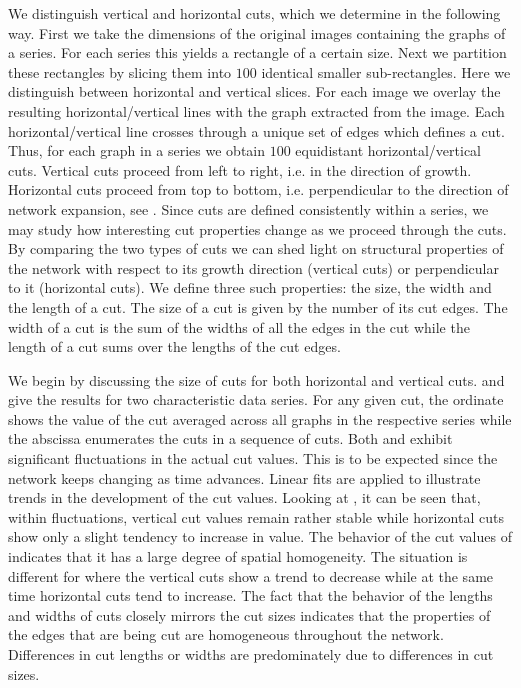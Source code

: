 		We distinguish vertical and horizontal cuts, which we determine in the following way. First we take the dimensions of the original images containing the graphs of a series. For each series this yields a rectangle of a certain size. Next we partition these rectangles by slicing them into $100$ identical smaller sub-rectangles. Here we distinguish between horizontal and vertical slices. For each image we overlay the resulting horizontal/vertical lines with the graph extracted from the image. Each horizontal/vertical line crosses through a unique set of edges which defines a cut. Thus, for each graph in a series we obtain $100$ equidistant horizontal/vertical cuts. Vertical cuts proceed from left to right, i.e. in the direction of growth. Horizontal cuts proceed from top to bottom, i.e. perpendicular to the direction of network expansion, see . Since cuts are defined consistently within a series, we may study how interesting cut properties change as we proceed through the cuts. By comparing the two types of cuts we can shed light on structural properties of the network with respect to its growth direction (vertical cuts) or perpendicular to it (horizontal cuts). We define three such properties: the size, the width and the length of a cut. The size of a cut is given by the number of its cut edges. The width of a cut is the sum of the widths of all the edges in the cut while the length of a cut sums over the lengths of the cut edges. 

		We begin by discussing the size of cuts for both horizontal and vertical cuts.  and  give the results for two characteristic data series. For any given cut, the ordinate shows the value of the cut averaged across all graphs in the respective series while the abscissa enumerates the cuts in a sequence of cuts. Both  and  exhibit significant fluctuations in the actual cut values. This is to be expected since the network keeps changing as time advances. Linear fits are applied to illustrate trends in the development of the cut values. Looking at , it can be seen that, within fluctuations, vertical cut values remain rather stable while horizontal cuts show only a slight tendency to increase in value. The behavior of the cut values of  indicates that it has a large degree of spatial homogeneity. The situation is different for  where the vertical cuts show a trend to decrease while at the same time horizontal cuts tend to increase. The fact that the behavior of the lengths and widths of cuts closely mirrors the cut sizes indicates that the properties of the edges that are being cut are homogeneous throughout the network. Differences in cut lengths or widths are predominately due to differences in cut sizes.

